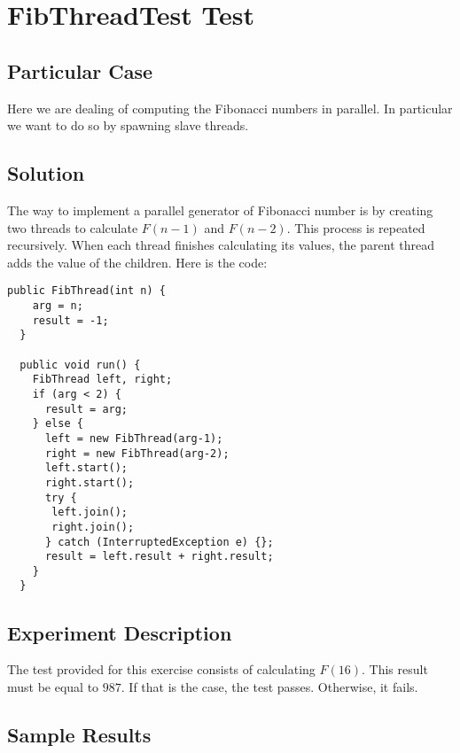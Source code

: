 \section{\textbf{FibThreadTest Test}}
\subsection{Particular Case}
\par
Here we are dealing of computing the Fibonacci numbers in parallel. In
particular we want to do so by spawning slave threads.
\par
\subsection{Solution}
\par
The way to implement a parallel generator of Fibonacci number is by creating two
threads to calculate $F(n-1)$ and $F(n-2)$. This process is repeated
recursively. When each thread finishes calculating its values, the parent thread
adds the value of the children. Here is the code:
\par
\hfill
\begin{lstlisting}[style=numbers]
  public FibThread(int n) {
    arg = n;
    result = -1;
  }

  public void run() {
    FibThread left, right;
    if (arg < 2) {
      result = arg;
    } else {
      left = new FibThread(arg-1);
      right = new FibThread(arg-2);
      left.start();
      right.start();
      try {
       left.join();
       right.join();
      } catch (InterruptedException e) {};
      result = left.result + right.result;
    }
  }
\end{lstlisting}
\hfill
\par
\subsection{Experiment Description}
\par
The test provided for this exercise consists of calculating $F(16)$. This result
must be equal to $987$. If that is the case, the test passes. Otherwise, it
fails.
\par
\subsection{Sample Results}
\par
\par
